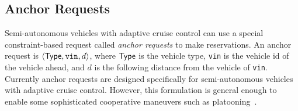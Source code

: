 \subsection{Anchor Requests}
\label{sec:anchor}

Semi-autonomous vehicles with adaptive cruise control can use a special
constraint-based request called \emph{anchor requests} to make
reservations. An anchor request is $\langle {\sf Type}, \texttt{vin},
d \rangle$, where ${\sf Type}$ is the vehicle type, \texttt{vin} is
the vehicle id of the vehicle ahead, and $d$ is the following
distance from the vehicle of \texttt{vin}. 
Currently anchor requests are designed specifically for
semi-autonomous vehicles with adaptive cruise control.  However, this
formulation is general enough to enable some sophisticated cooperative
maneuvers such as platooning~\cite{bib:Sheikholeslam90Longitudinal}.













